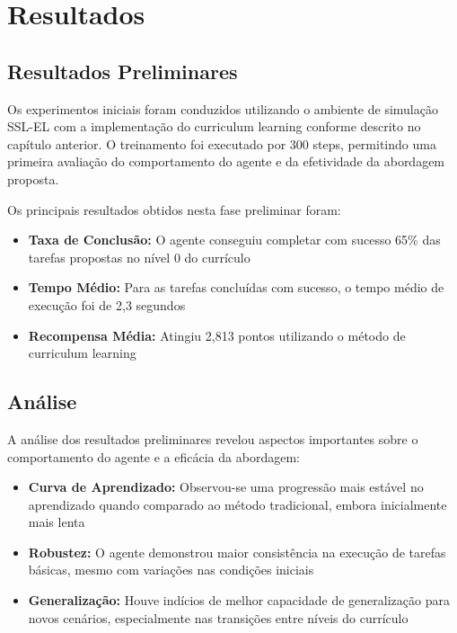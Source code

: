 \chapter{Resultados}
\label{cap:resultados}

\section{Resultados Preliminares}

Os experimentos iniciais foram conduzidos utilizando o ambiente de simulação SSL-EL com a implementação do curriculum learning conforme descrito no capítulo anterior. O treinamento foi executado por 300 steps, permitindo uma primeira avaliação do comportamento do agente e da efetividade da abordagem proposta.

Os principais resultados obtidos nesta fase preliminar foram:

\begin{itemize}
    \item \textbf{Taxa de Conclusão:} O agente conseguiu completar com sucesso 65\% das tarefas propostas no nível 0 do currículo
    
    \item \textbf{Tempo Médio:} Para as tarefas concluídas com sucesso, o tempo médio de execução foi de 2,3 segundos
    
    \item \textbf{Recompensa Média:} Atingiu 2,813 pontos utilizando o método de curriculum learning
\end{itemize}

\section{Análise}

A análise dos resultados preliminares revelou aspectos importantes sobre o comportamento do agente e a eficácia da abordagem:

\begin{itemize}
    \item \textbf{Curva de Aprendizado:} Observou-se uma progressão mais estável no aprendizado quando comparado ao método tradicional, embora inicialmente mais lenta
    
    \item \textbf{Robustez:} O agente demonstrou maior consistência na execução de tarefas básicas, mesmo com variações nas condições iniciais
    
    \item \textbf{Generalização:} Houve indícios de melhor capacidade de generalização para novos cenários, especialmente nas transições entre níveis do currículo
\end{itemize}

